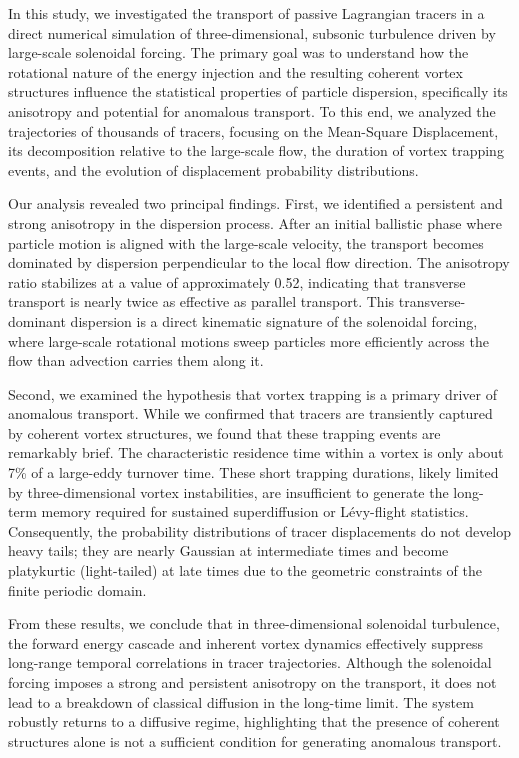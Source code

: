 \documentclass[]{article}
\begin{document}
In this study, we investigated the transport of passive Lagrangian tracers in a direct numerical simulation of three-dimensional, subsonic turbulence driven by large-scale solenoidal forcing. The primary goal was to understand how the rotational nature of the energy injection and the resulting coherent vortex structures influence the statistical properties of particle dispersion, specifically its anisotropy and potential for anomalous transport. To this end, we analyzed the trajectories of thousands of tracers, focusing on the Mean-Square Displacement, its decomposition relative to the large-scale flow, the duration of vortex trapping events, and the evolution of displacement probability distributions.

Our analysis revealed two principal findings. First, we identified a persistent and strong anisotropy in the dispersion process. After an initial ballistic phase where particle motion is aligned with the large-scale velocity, the transport becomes dominated by dispersion perpendicular to the local flow direction. The anisotropy ratio stabilizes at a value of approximately 0.52, indicating that transverse transport is nearly twice as effective as parallel transport. This transverse-dominant dispersion is a direct kinematic signature of the solenoidal forcing, where large-scale rotational motions sweep particles more efficiently across the flow than advection carries them along it.

Second, we examined the hypothesis that vortex trapping is a primary driver of anomalous transport. While we confirmed that tracers are transiently captured by coherent vortex structures, we found that these trapping events are remarkably brief. The characteristic residence time within a vortex is only about 7\% of a large-eddy turnover time. These short trapping durations, likely limited by three-dimensional vortex instabilities, are insufficient to generate the long-term memory required for sustained superdiffusion or Lévy-flight statistics. Consequently, the probability distributions of tracer displacements do not develop heavy tails; they are nearly Gaussian at intermediate times and become platykurtic (light-tailed) at late times due to the geometric constraints of the finite periodic domain.

From these results, we conclude that in three-dimensional solenoidal turbulence, the forward energy cascade and inherent vortex dynamics effectively suppress long-range temporal correlations in tracer trajectories. Although the solenoidal forcing imposes a strong and persistent anisotropy on the transport, it does not lead to a breakdown of classical diffusion in the long-time limit. The system robustly returns to a diffusive regime, highlighting that the presence of coherent structures alone is not a sufficient condition for generating anomalous transport.
\end{document}
